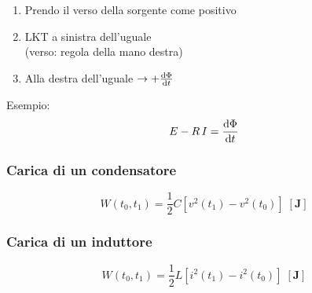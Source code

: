 \documentclass[10pt]{article}
\newcommand{\unit}[1]{\left[\mathbf{#1}\right]}
\begin{document}
        \begin{minipage}[t]{.4\textwidth}
            \vspace{-2cm}

            \begin{enumerate}
                \item Prendo il verso della sorgente come positivo
                \item LKT a sinistra dell'uguale\\(verso: regola della mano destra)
                \item Alla destra dell'uguale \(\rightarrow + \dv{\Phi}{t}\)
            \end{enumerate}

        \end{minipage}
        \hspace{.6cm}
        \begin{minipage}[t]{.1\textwidth}
            \vspace{-1.75cm}

            Esempio: 
            \[
                E - R \, I = \dv{\Phi}{t}
            \]

        \end{minipage}
        \hspace{.6cm}
        \begin{minipage}[t]{.1\textwidth}

            

        \end{minipage}
        \hspace{.6cm}
        \begin{minipage}[t]{.3\textwidth}
            \vspace{-2cm}

            \subsubsection*{Carica di un condensatore}

                \[
                    W(t_0, t_1) = \frac{1}{2} C \left[v^2 (t_1) - v^2 (t_0)\right] \; \unit{J}
                \]

            \vspace{-.5cm}

            \subsubsection*{Carica di un induttore}

                \[
                    W(t_0, t_1) = \frac{1}{2} L \left[i^2 (t_1) - i^2 (t_0)\right] \; \unit{J}
                \]

        \end{minipage}
\end{document}

